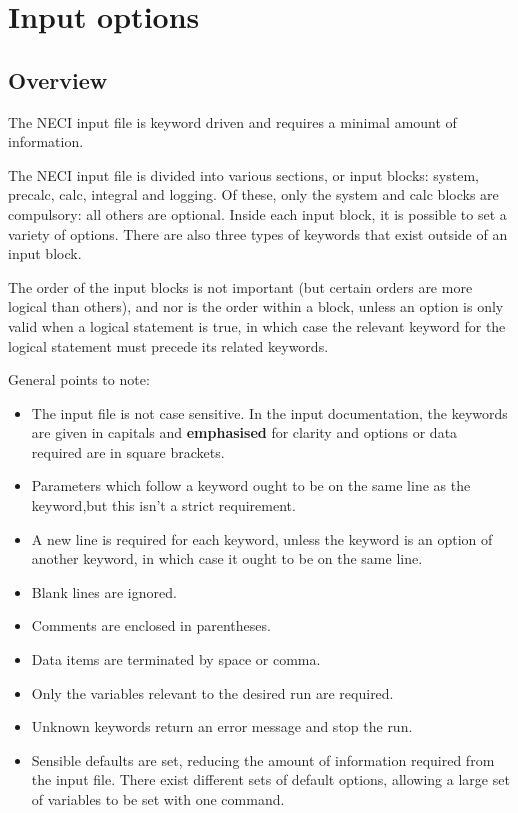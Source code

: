 \documentclass[openany,a4paper,10pt]{manual}
\begin{document}
\hypertarget{input-index}{}\chapter{Input options}

\resetcurrentobjects


\hypertarget{input-overview}{}\section{Overview}

The NECI input file is keyword driven and requires a minimal amount of information.

The NECI input file is divided into various sections, or input blocks: system, precalc, calc, integral and logging.  Of these, only the system and calc blocks are compulsory: all others are optional.  Inside each input block, it is possible to set a variety of options.  There are also three types of keywords that exist outside of an input block.

The order of the input blocks is not important (but certain orders are more logical than others), and nor is the order within a block, unless an option is only valid when a logical statement is true, in which case the relevant keyword for the logical statement must precede its related keywords.

General points to note:
\begin{itemize}
\item {} 
The input file is not case sensitive.  In the input documentation, the keywords are given in capitals and \textbf{emphasised} for clarity and options or data required are in square brackets.

\item {} 
Parameters which follow a keyword ought to be on the same line as the keyword,but this isn't a strict requirement.

\item {} 
A new line is required for each keyword, unless the keyword is an option of another keyword, in which case it ought to be on the same line.

\item {} 
Blank lines are ignored.

\item {} 
Comments are enclosed in parentheses.

\item {} 
Data items are terminated by space or comma.

\item {} 
Only the variables relevant to the desired run are required.

\item {} 
Unknown keywords return an error message and stop the run.

\item {} 
Sensible defaults are set, reducing the amount of information required from the input file.  There exist different sets of default options, allowing a large set of variables to be set with one command.

\end{itemize}
\end{document}
